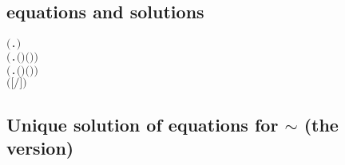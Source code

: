 \subsection{\Multivariate equations and solutions}

\begin{alltt}
\HOLTokenTurnstile{}    \HOLSymConst{\HOLTokenEquiv{}}
     \HOLSymConst{\HOLTokenConj{}}   \HOLSymConst{\ensuremath{=}}   \HOLSymConst{\HOLTokenConj{}}  \ensuremath{(}\HOLTokenLambda{}.   \HOLSymConst{\HOLTokenSubset{}}  \ensuremath{)}  \HOLSymConst{\HOLTokenConj{}}
    \ensuremath{(}\HOLTokenLambda{}.  \ensuremath{(} \ensuremath{)} \ensuremath{(} \ensuremath{)}\ensuremath{)} 
\HOLTokenTurnstile{}      \HOLSymConst{\HOLTokenEquiv{}}
     \HOLSymConst{\HOLTokenConj{}}  \ensuremath{(}\HOLTokenLambda{}.  \ensuremath{(} \ensuremath{)} \ensuremath{(} \ensuremath{)}\ensuremath{)}  \HOLSymConst{\HOLTokenConj{}}
      \ensuremath{(} \ensuremath{[}\ensuremath{/}\ensuremath{]} \ensuremath{)}
\end{alltt}

\subsection{Unique solution of equations for $\sim$ (the \multivariate version)}

